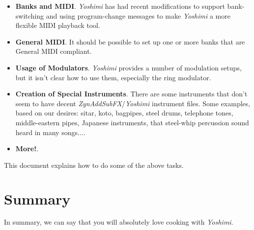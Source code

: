 \documentclass[
 11pt,
 twoside,
 a4paper,
 headinclude,
 footinclude,
 final                                 %
]{article}
\begin{document}
   \begin{itemize}
      \item \textbf{Banks and MIDI}.
         \textsl{Yoshimi} has had recent modifications to support
         bank-switching and using program-change messages to make
         \textsl{Yoshimi} a more flexible MIDI playback tool.
      \item \textbf{General MIDI}.
         It should be possible to set up one or more banks that
         are General MIDI compliant.
      \item \textbf{Usage of Modulators}.
         \textsl{Yoshimi} provides a number of modulation setups,
         but it isn't clear how to use them, especially the ring modulator.
      \item \textbf{Creation of Special Instruments}.
         There are some instruments that don't seem to have
         decent \textsl{ZynAddSubFX}/\textsl{Yoshimi} instrument files.
         Some examples, based on our desires: sitar, koto, bagpipes, steel
         drums, telephone tones, middle-eastern pipes, Japanese instruments,
         that steel-whip percussion sound heard in many songs....
      \item \textbf{More!}.
   \end{itemize}

   This document explains how to do some of the above tasks.


\rhead{\rightmark}         %



















% 

\section{Summary}
\label{sec:summary}

   In summary, we can say that you will absolutely love 
   cooking with \textsl{Yoshimi}.




\printindex
\end{document}
